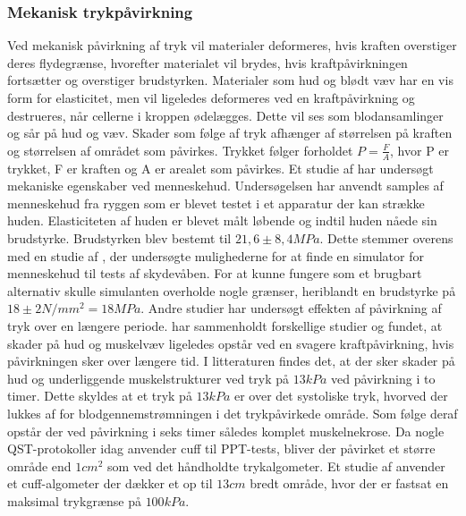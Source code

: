 \subsubsection{Mekanisk trykpåvirkning}
Ved mekanisk påvirkning af tryk vil materialer deformeres, hvis kraften overstiger deres flydegrænse, hvorefter materialet vil brydes, hvis kraftpåvirkningen fortsætter og overstiger brudstyrken. Materialer som hud og blødt væv har en vis form for elasticitet, men vil ligeledes deformeres ved en kraftpåvirkning og destrueres, når cellerne i kroppen ødelægges. Dette vil ses som blodansamlinger og sår på hud og væv. Skader som følge af tryk afhænger af størrelsen på kraften og størrelsen af området som påvirkes. Trykket følger forholdet $P = \frac{F}{A}$, hvor P er trykket, F er kraften og A er arealet som påvirkes. Et studie af  har undersøgt mekaniske egenskaber ved menneskehud. Undersøgelsen har anvendt samples af menneskehud fra ryggen som er blevet testet i et apparatur der kan strække huden. Elasticiteten af huden er blevet målt løbende og indtil huden nåede sin brudstyrke. Brudstyrken blev bestemt til $21,6 \pm 8,4 MPa$. Dette stemmer overens med en studie af , der undersøgte mulighederne for at finde en simulator for menneskehud til tests af skydevåben. For at kunne fungere som et brugbart alternativ skulle simulanten overholde nogle grænser, heriblandt en brudstyrke på $18 \pm 2 N/mm^{2} = 18 MPa$. Andre studier har undersøgt effekten af påvirkning af tryk over en længere periode.  har sammenholdt forskellige studier og fundet, at skader på hud og muskelvæv ligeledes opstår ved en svagere kraftpåvirkning, hvis påvirkningen sker over længere tid. I litteraturen findes det, at der sker skader på hud og underliggende muskelstrukturer ved tryk på $13 kPa$ ved påvirkning i to timer. Dette skyldes at et tryk på $13 kPa$ er over det systoliske tryk, hvorved der lukkes af for blodgennemstrømningen i det trykpåvirkede område. Som følge deraf opstår der ved påvirkning i seks timer således komplet muskelnekrose. \citep{sanders1995} Da nogle QST-protokoller idag anvender cuff til PPT-tests, bliver der påvirket et større område end $1 cm^{2}$ som ved det håndholdte trykalgometer. Et studie af  anvender et cuff-algometer der dækker et op til $13cm$ bredt område, hvor der er fastsat en maksimal trykgrænse på $100kPa$.

